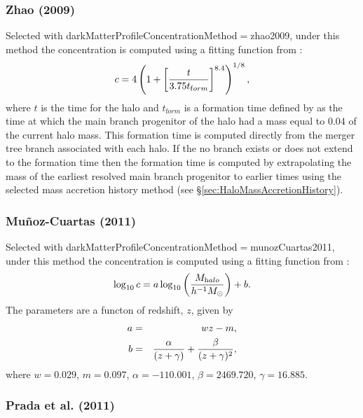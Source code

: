 \subsubsection{Zhao (2009)}\label{phys:darkMatterProfileConcentration:darkMatterProfileConcentrationZhao2009}

Selected with {\normalfont \ttfamily darkMatterProfileConcentrationMethod}$=${\normalfont \ttfamily zhao2009}, under this method the concentration is computed using a fitting function from \cite{zhao_accurate_2009}:
\begin{equation}
 c = 4 \left(1 + \left[ {t  \over 3.75 t_{\mathrm form}}\right]^{8.4}\right)^{1/8},
\end{equation}
where $t$ is the time for the halo and $t_{\mathrm form}$ is a formation time defined by \cite{zhao_accurate_2009} as the time at which the main branch progenitor of the halo had a mass equal to $0.04$ of the current halo mass. This formation time is computed directly from the merger tree branch associated with each halo. If the no branch exists or does not extend to the formation time then the formation time is computed by extrapolating the mass of the earliest resolved main branch progenitor to earlier times using the selected mass accretion history method (see \S\ref{sec:HaloMassAccretionHistory}).

\subsubsection{Mu\~noz-Cuartas (2011)}\label{phys:darkMatterProfileConcentration:darkMatterProfileConcentrationMunozCuartas2011}

Selected with {\normalfont \ttfamily darkMatterProfileConcentrationMethod}$=${\normalfont \ttfamily munozCuartas2011}, under this method the concentration is computed using a fitting function from \cite{munoz-cuartas_redshift_2011}:
\begin{equation}
\log_{10} c = a \log_{10} \left( {M_{\mathrm halo} \over h^{-1}M_\odot} \right) + b.
\end{equation}
The parameters are a functon of redshift, $z$, given by
\begin{eqnarray}
a &=& wz-m, \\
b &=& {\alpha \over (z+\gamma)} + {\beta \over (z+\gamma)^2},
\end{eqnarray}
where $w=0.029$, $m=0.097$, $\alpha=-110.001$, $\beta=2469.720$, $\gamma=16.885$.

\subsubsection{Prada et al. (2011)}\label{phys:darkMatterProfileConcentration:darkMatterProfileConcentrationPrada2011}

